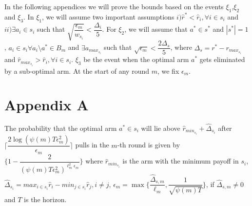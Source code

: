 
\appendix

	In the following appendices we will prove the bounds based on the events $\xi_{1}$,$\xi_{2}$ and $\xi_{3}$. In $\xi_{1}$, we will assume two important assumptions $i)\hat{r}^{*}<\hat{r}_{i},\forall i\in s_{i}$ and $ii)\exists a_{i}\in s_{i}$ such that $\sqrt{\dfrac{\epsilon_{m}}{w_{s_{i}}}}<\dfrac{\Delta_{i}}{5}$. For $\xi_{2}$, we will assume that $a^{*}\in s^{*}$ and $|s^{*}|=1$, $a_{i}\in s_{i} \forall a_{i}\setminus a^{*}\in B_{m}$ and $\exists a_{max_{s_{i}}}$ such that $\sqrt{\epsilon_{m}}<\dfrac{2\Delta_{s}}{5}$, where $\Delta_{s}=r^{*}-r_{max_{s_{i}}}$ and $\hat{r}_{max_{s_{i}}}>\hat{r}_{i}, \forall i\in s_{i}$. $\xi_{3}$ be the event when the optimal arm $a^{*}$ gets eliminated by a sub-optimal arm. At the start of any round $m$, we fix $\epsilon_{m}$.



\section*{Appendix A}
\begin{proposition}
The probability that the optimal arm $a^{*}\in s_{i}$ will lie above $\hat{r}_{min_{s_{i}}}+ \hat{\Delta}_{s_{i}}$ after $\bigg\lceil\dfrac{2\log (\psi(m)T\epsilon_{m}^{2})}{\epsilon_{m}}\bigg\rceil$ pulls in the $m$-th round is given by $\bigg\lbrace 1- \dfrac{2}{(\psi(m)T\epsilon_{m}^{2})^{\ell_{m}^{2}\epsilon_{m}}} \bigg\rbrace$ where $\hat{r}_{min_{s_{i}}}$ is the arm with the minimum payoff in $s_{i}$, $\hat{\Delta}_{s_{i}}=max_{i\in s_{i}}\hat{r}_{i}-min_{j\in s_{i}}\hat{r}_{j}, i\neq j$, $\epsilon_{m}=\max{\bigg\lbrace\dfrac{\hat{\Delta}_{s,m}}{\ell_{m}}, \dfrac{1}{\sqrt{\psi{(m)T}}}\bigg\rbrace}$, if $\hat{\Delta}_{s,m}\neq 0$ and $T$ is the horizon.  
\end{proposition}

